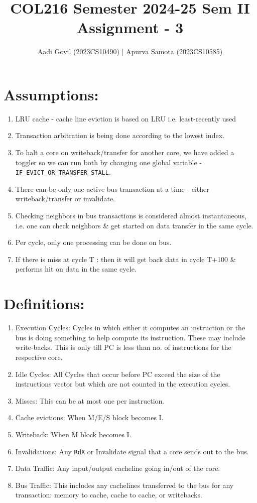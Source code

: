 \documentclass{article}
\title{COL216 Semester 2024-25 Sem II Assignment - 3}
\author{
    Aadi Govil (2023CS10490) |
    Apurva Samota (2023CS10585)
}
\begin{document}
\maketitle

\section{Assumptions:}
\begin{enumerate}
    \item LRU cache - cache line eviction is based on LRU i.e. least-recently used 
    \item Transaction arbitration is being done according to the lowest index.
    \item To halt a core on writeback/transfer for another core, we have added a toggler so we can run both by changing one global variable - \texttt{IF\_EVICT\_OR\_TRANSFER\_STALL}.
    \item There can be only one active bus transaction at a time - either writeback/transfer or invalidate.
    \item Checking neighbors in bus transactions is considered almost instantaneous, i.e. one can check neighbors \& get started on data transfer in the same cycle.
    \item Per cycle, only one processing can be done on bus.
    \item If there is miss at cycle T : then it will get back data in cycle T+100 \& performs hit on data in the same cycle.
\end{enumerate}

\section{Definitions:}
\begin{enumerate}
    \item Execution Cycles: Cycles in which either it computes an instruction or the bus is doing something to help compute its instruction. These may include write-backs. This is only till PC is less than no. of instructions for the respective core.
    \item Idle Cycles: All Cycles that occur before PC exceed the size of the instructions vector but which are not counted in the execution cycles.
    \item Misses: This can be at most one per instruction.
    \item Cache evictions: When M/E/S block becomes I.
    \item Writeback: When M block becomes I.
    \item Invalidations: Any \texttt{RdX} or Invalidate signal that a core sends out to the bus.
    \item Data Traffic: Any input/output cacheline going in/out of the core.
    \item Bus Traffic: This includes any cachelines transferred to the bus for any transaction: memory to cache, cache to cache, or writebacks.
    
\end{enumerate}
\end{document}
